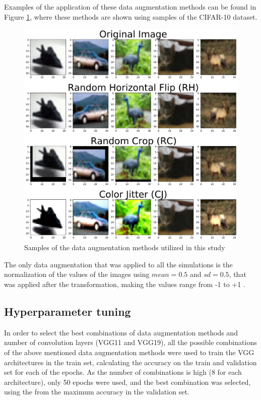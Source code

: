 \documentclass[10pt,twocolumn,letterpaper]{article}
\begin{document}
Examples of the application of these data augmentation methods can be found in Figure \ref{fig:samples_dataug}, where these methods are shown using samples of the CIFAR-10 dataset.

\begin{figure}[h]
	\begin{center}
		\includegraphics[width=1.0\linewidth]{samples_images_transformation.pdf}
	\end{center}
	\caption{Samples of the data augmentation methods utilized in this study}
	\label{fig:samples_dataug}
\end{figure}


The only data augmentation that was applied to all the simulations is the normalization of the values of the images using $mean = 0.5$ and $sd = 0.5$, that was applied after the transformation, making the values range from -1 to +1 \cite{Skansi2018}.

\subsection{Hyperparameter tuning}

In order to select the best combinations of data augmentation methods and number of convolution layers (VGG11 and VGG19), all the possible combinations of the above mentioned data augmentation methods were used to train the VGG architectures in the train set, calculating the accuracy on the train and validation set for each of the epochs. As the number of combinations is high (8 for each architecture), only 50 epochs were used, and the best combination was selected, using the from the maximum accuracy in the validation set.
\end{document}
